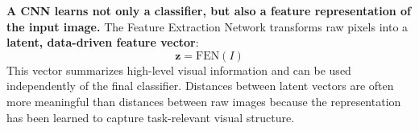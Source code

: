 \highspace
\begin{takeawaysbox}
    \textbf{A CNN learns not only a classifier, but also a feature representation of the input image.} The Feature Extraction Network transforms raw pixels into a \textbf{latent, data-driven feature vector}:
    \begin{equation*}
        \mathbf{z} = \mathrm{FEN}(I)
    \end{equation*}
    This vector summarizes high-level visual information and can be used independently of the final classifier. Distances between latent vectors are often more meaningful than distances between raw images because the representation has been learned to capture task-relevant visual structure.
\end{takeawaysbox}